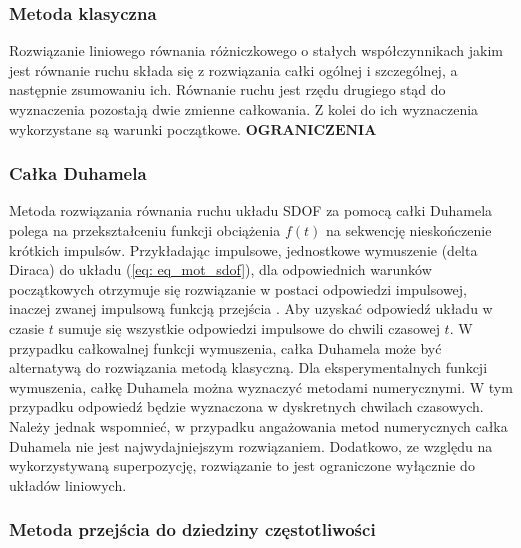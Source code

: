 \subsubsection{Metoda klasyczna}

Rozwiązanie liniowego równania różniczkowego o stałych współczynnikach jakim jest równanie ruchu składa się z rozwiązania całki ogólnej i szczególnej, a następnie zsumowaniu ich. Równanie ruchu jest rzędu drugiego stąd do wyznaczenia pozostają dwie zmienne całkowania. Z kolei do ich wyznaczenia wykorzystane są warunki początkowe. $\bm{OGRANICZENIA}$

\subsubsection{Całka Duhamela}

Metoda rozwiązania równania ruchu układu SDOF za pomocą całki Duhamela polega na przekształceniu funkcji obciążenia $f(t)$ na sekwencję nieskończenie krótkich impulsów. Przykładając impulsowe, jednostkowe wymuszenie (delta Diraca) do układu (\ref{eq: eq_mot_sdof}), dla odpowiednich warunków początkowych otrzymuje się rozwiązanie w postaci odpowiedzi impulsowej, inaczej zwanej impulsową funkcją przejścia . Aby uzyskać odpowiedź układu w czasie $t$ sumuje się wszystkie odpowiedzi impulsowe do chwili czasowej $t$. W przypadku całkowalnej funkcji wymuszenia, całka Duhamela może być alternatywą do rozwiązania metodą klasyczną. Dla eksperymentalnych funkcji wymuszenia, całkę Duhamela można wyznaczyć metodami numerycznymi. W tym przypadku odpowiedź będzie wyznaczona w dyskretnych chwilach czasowych. Należy jednak wspomnieć, w przypadku angażowania metod numerycznych całka Duhamela nie jest najwydajniejszym rozwiązaniem. Dodatkowo, ze względu na wykorzystywaną superpozycję, rozwiązanie to jest ograniczone wyłącznie do układów liniowych.

\subsubsection{Metoda przejścia do dziedziny częstotliwości}

